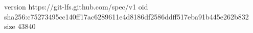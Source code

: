 version https://git-lfs.github.com/spec/v1
oid sha256:c75273495cc140ff17ac6289611e4d8186df2586ddff517eba91b445e262b832
size 43840

